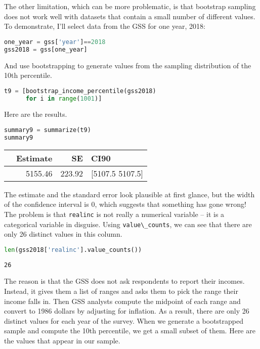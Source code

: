 The other limitation, which can be more problematic, is that bootstrap
sampling does not work well with datasets that contain a small number of
different values. To demonstrate, I'll select data from the GSS for one
year, 2018:

\begin{lstlisting}[language=Python,style=source]
one_year = gss['year']==2018
gss2018 = gss[one_year]
\end{lstlisting}

\pagebreak

And use bootstrapping to generate values from the sampling
distribution of the 10th percentile.

\begin{lstlisting}[language=Python,style=source]
t9 = [bootstrap_income_percentile(gss2018)
      for i in range(1001)]
\end{lstlisting}

Here are the results.

\begin{lstlisting}[language=Python,style=source]
summary9 = summarize(t9)
summary9
\end{lstlisting}

\begin{tabular}{lrrl}
\toprule
 & Estimate & SE & CI90 \\
\midrule
 & 5155.46 & 223.92 & [5107.5 5107.5] \\
\bottomrule
\end{tabular}

The estimate and the standard error look plausible at first glance, but
the width of the confidence interval is 0, which suggests that something
has gone wrong! The problem is that \passthrough{\lstinline!realinc!} is
not really a numerical variable -- it is a categorical variable in
disguise. Using \passthrough{\lstinline!value\_counts!}, we can see that
there are only 26 distinct values in this column.

\begin{lstlisting}[language=Python,style=source]
len(gss2018['realinc'].value_counts())
\end{lstlisting}

\begin{lstlisting}[style=output]
26
\end{lstlisting}

The reason is that the GSS does not ask respondents to report their
incomes. Instead, it gives them a list of ranges and asks them to pick
the range their income falls in. Then GSS analysts compute the midpoint
of each range and convert to 1986 dollars by adjusting for inflation. As
a result, there are only 26 distinct values for each year of the survey.
When we generate a bootstrapped sample and compute the 10th percentile,
we get a small subset of them. Here are the values that appear in our
sample.

